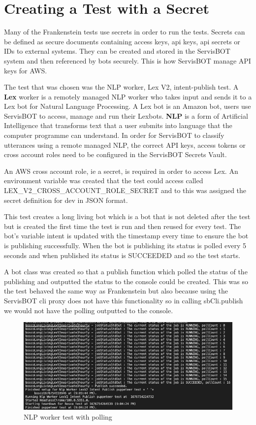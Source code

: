 \documentclass[12pt,a4paper,titlepage]{report}
\begin{document}
\section{Creating a Test with a Secret}
Many of the Frankenstein tests use secrets in order to run the tests. Secrets can be defined as secure documents containing access keys, api keys, api secrets or IDs to external systems. They can be created and stored in the ServisBOT system and then referenced by bots securely. 
This is how ServisBOT manage API keys for AWS\@.

The test that was chosen was the NLP worker, Lex V2, intent-publish test. A \textbf{Lex} worker is a remotely managed NLP worker who takes input and sends it to a Lex bot for Natural Language Processing. A Lex bot is an Amazon bot, users use ServisBOT to access, manage and run their Lexbots. 
\textbf{NLP} is a form of Artificial Intelligence that transforms text that a user submits into language that the computer programme can understand. In order for ServisBOT to classify utterances using a remote managed NLP, the correct API keys, access tokens or cross account roles need to be configured in the ServisBOT Secrets Vault.

An AWS cross account role, ie a secret, is required in order to access Lex. An environment variable was created that the test could access called LEX\_V2\_CROSS\_ACCOUNT\_ROLE\_SECRET and to this was assigned the secret definition for dev in JSON format. 

This test creates a long living bot which is a bot that is not deleted after the test but is created the first time the test is run and then reused for every test. The bot's variable intent is updated with the timestamp every time to ensure the bot is publishing successfully. When the bot is publishing its status is polled every 5 seconds and when published its status is SUCCEEDED and so the test starts.

A bot class was created so that a publish function which polled the status of the publishing and outputted the status to the console could be created. This was so 
the test behaved the same way as Frankenstein but also because using the ServisBOT cli proxy does not have this functionality so in calling sbCli.publish we would 
not have the polling outputted to the console.

\begin{figure}[H]
 \centering
 \includegraphics[width=15cm]{./diagrams/nlp_worker_poll.png}
 \caption{NLP worker test with polling}
\end{figure}
\end{document}
